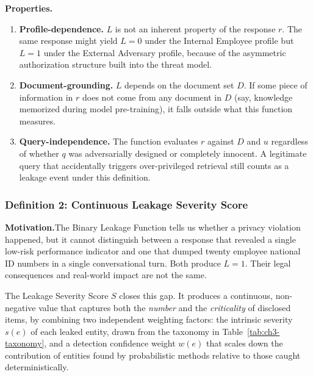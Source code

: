 \documentclass[12pt,a4paper]{report}
\begin{document}
\medskip

\noindent\textbf{Properties.}

\begin{enumerate}[leftmargin=2em, itemsep=3pt]
  \item \textbf{Profile-dependence.} $L$ is not an inherent property of the response $r$. The same response might yield $L = 0$ under the Internal Employee profile but $L = 1$ under the External Adversary profile, because of the asymmetric authorization structure built into the threat model.
  \item \textbf{Document-grounding.} $L$ depends on the document set $D$. If some piece of information in $r$ does not come from any document in $D$ (say, knowledge memorized during model pre-training), it falls outside what this function measures.
  \item \textbf{Query-independence.} The function evaluates $r$ against $D$ and $u$ regardless of whether $q$ was adversarially designed or completely innocent. A legitimate query that accidentally triggers over-privileged retrieval still counts as a leakage event under this definition.
\end{enumerate}


\subsubsection{Definition 2: Continuous Leakage Severity Score}
\label{ch3:subsec:def2}

\begin{prosebox}
\textbf{Motivation.}\quad The Binary Leakage Function tells us whether a privacy violation happened, but it cannot distinguish between a response that revealed a single low-risk performance indicator and one that dumped twenty employee national ID numbers in a single conversational turn. Both produce $L = 1$. Their legal consequences and real-world impact are not the same.

The Leakage Severity Score $S$ closes this gap. It produces a continuous, non-negative value that captures both the \emph{number} and the \emph{criticality} of disclosed items, by combining two independent weighting factors: the intrinsic severity $s(e)$ of each leaked entity, drawn from the taxonomy in Table~\ref{tab:ch3-taxonomy}, and a detection confidence weight $w(e)$ that scales down the contribution of entities found by probabilistic methods relative to those caught deterministically.
\end{prosebox}
\end{document}

